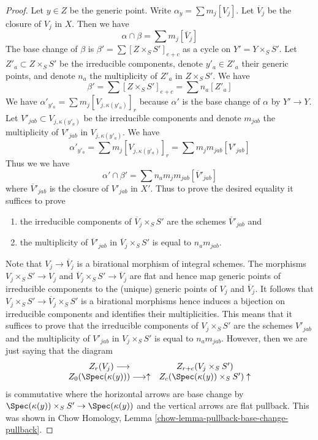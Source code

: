 \begin{proof}
\medskip\noindent
Let $y \in Z$ be the generic point. Write $\alpha_y = \sum m_j [V_j]$.
Let $\overline{V}_j$ be the closure of $V_j$ in $X$. Then we have
$$
\alpha \cap \beta = \sum m_j[\overline{V}_j]
$$
The base change of $\beta$ is $\beta' = \sum [Z \times_S S']_{e + c}$ as a
cycle on $Y' = Y \times_S S'$. Let $Z'_a \subset Z \times_S S'$
be the irreducible components, denote $y'_a \in Z'_a$ their generic points,
and denote $n_a$ the multiplicity of $Z'_a$ in $Z \times_S S'$.
We have
$$
\beta' = \sum [Z \times_S S']_{e + c} = \sum n_a[Z'_a]
$$
We have $\alpha'_{y'_a} = \sum m_j [V_{j, \kappa(y'_a)}]_r$
because $\alpha'$ is the base change of $\alpha$ by $Y' \to Y$.
Let $V'_{jab} \subset V_{j, \kappa(y'_a)}$ be the irreducible components
and denote $m_{jab}$ the multiplicity of $V'_{jab}$
in $V_{j, \kappa(y'_a)}$. We have
$$
\alpha'_{y'_a} = \sum m_j [V_{j, \kappa(y'_a)}]_r =
\sum m_j m_{jab} [V'_{jab}]
$$
Thus we we have
$$
\alpha' \cap \beta' = \sum n_a m_j m_{jab} [\overline{V}'_{jab}]
$$
where $\overline{V}'_{jab}$ is the closure of $V'_{jab}$ in $X'$.
Thus to prove the desired equality it suffices to prove
\begin{enumerate}
\item the irreducible components of $\overline{V}_j \times_S S'$
are the schemes $\overline{V}'_{jab}$ and
\item the multiplicity of $\overline{V}'_{jab}$ in
$\overline{V}_j \times_S S'$ is equal to $n_a m_{jab}$.
\end{enumerate}
Note that $V_j \to \overline{V}_j$ is a birational morphism of
integral schemes. The morphisms $V_j \times_S S' \to V_j$
and $\overline{V}_j \times_S S' \to \overline{V}_j$ are flat
and hence map generic points of irreducible components to the
(unique) generic points of $V_j$ and $\overline{V}_j$.
It follows that $V_j \times_S S' \to \overline{V}_j \times_S S'$
is a birational morphisms hence induces a bijection on irreducible
components and identifies their multiplicities.
This means that it suffices to prove that the irreducible components of
$V_j \times_S S'$ are the schemes $V'_{jab}$ and
the multiplicity of $V'_{jab}$ in $V_j \times_S S'$
is equal to $n_a m_{jab}$. However, then we are just saying
that the diagram
$$
\begin{array}{cc}Z_r(V_j) \longrightarrow & Z_{r + c}(V_j \times_S S') \\ Z_0(\Spec(\kappa(y))) \longrightarrow\uparrow & Z_c(\Spec(\kappa(y)) \times_S S') \uparrow\end{array}
$$
is commutative where the horizontal arrows are base change by
$\Spec(\kappa(y)) \times_S S' \to \Spec(\kappa(y))$ and
the vertical arrows are flat pullback. This was shown in
Chow Homology, Lemma \ref{chow-lemma-pullback-base-change-pullback}.


\end{proof}
